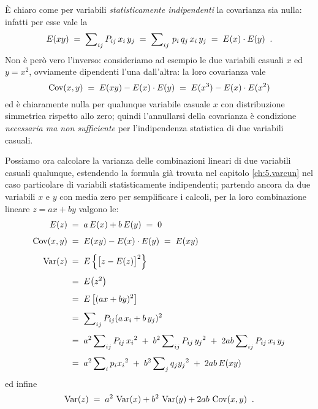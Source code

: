 \`E chiaro come per variabili \emph{statisticamente
  indipendenti} la covarianza sia nulla:%
infatti per esse vale la
\begin{equation*}
  E(xy) \; = \; \sum \nolimits_{ij} P_{ij} \, x_i
    \, y_j \; = \; \sum \nolimits_{ij} \, p_i \, q_j
    \, x_i \,y_j \; = \; E(x) \cdot E(y) \;\; .
\end{equation*}
Non \`e per\`o vero l'inverso: consideriamo ad esempio le
due variabili casuali $x$ ed $y = x^2$, ovviamente
dipendenti l'una dall'altra: la loro covarianza vale
\begin{equation*}
  \operatorname{Cov}(x,y) \; = \; E(xy) - E(x) \cdot E(y) \; = \; E(x^3)
    - E(x) \cdot E(x^2)
\end{equation*}
ed \`e chiaramente nulla per qualunque variabile casuale $x$
con distribuzione simmetrica rispetto allo zero; quindi
l'annullarsi della covarianza \`e condizione
\emph{necessaria ma non sufficiente} per l'indipendenza
statistica di due variabili casuali.%

%
%
Possiamo ora calcolare la varianza delle combinazioni
lineari di due variabili casuali qualunque, estendendo la
formula gi\`a trovata nel capitolo \ref{ch:5.varcun} nel
caso particolare di variabili statisticamente indipendenti;
partendo ancora da due variabili $x$ e $y$ con media zero
per semplificare i calcoli, per la loro combinazione lineare
$z = ax + by $ valgono le:
\begin{align*}
  E(z) \; &= \; a \, E(x) + b \, E(y) \; = \; 0 \\[1ex]
  \operatorname{Cov} (x, y) \; &= \; E(xy) - E(x) \cdot E(y) \; = \;
    E(xy) \\[1ex]
  \operatorname{Var} (z) \; &= \; E \left\{ \bigl[ z - E(z) \bigr]^2
    \right\} \\[1ex]
  &= \; E \bigl( z^2 \bigr) \\[1ex]
  &= \; E \left[ (ax + by) ^2 \right] \\[1ex]
  &= \; \sum \nolimits_{ij} P_{ij} (a \, x_i +
    b \, y_j) ^2 \\[1ex]
  &= \; a^2 \sum \nolimits_{ij} P_{ij} \,
    {x_i}^2 \; + \; b^2 \sum \nolimits_{ij}
    P_{ij} \, {y_j}^2 \; + \; 2 a b
    \sum \nolimits_{ij} P_{ij} \, x_i \, y_j
    \\[1ex]
  &= \; a^2 \sum \nolimits_i p_i {x_i}^2 \; + \;
    b^2 \sum \nolimits_j q_j {y_j}^2 \; + \;
    2 a b \, E(xy)
\end{align*}
ed infine
\begin{equation} \label{eq:c.varcol}
  \operatorname{Var} (z) \; = \; a^2 \, \operatorname{Var} (x) + b^2 \, \operatorname{Var} (y)
    + 2 a b \, \operatorname{Cov}(x, y) \;\; .
\end{equation}

